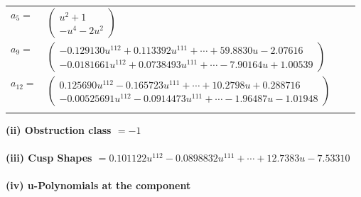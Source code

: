 \documentclass[1p]{elsarticle_modified}
\theoremstyle{definition}
\begin{document}
\begin{tabular}{m{7pt} m{180pt} m{7pt} m{180pt} }
\flushright $a_{5}=$&$\begin{pmatrix}u^2+1\\- u^4-2 u^2\end{pmatrix}$ \\
\flushright $a_{9}=$&$\begin{pmatrix}-0.129130 u^{112}+0.113392 u^{111}+\cdots+59.8830 u-2.07616\\-0.0181661 u^{112}+0.0738493 u^{111}+\cdots-7.90164 u+1.00539\end{pmatrix}$ \\
\flushright $a_{12}=$&$\begin{pmatrix}0.125690 u^{112}-0.165723 u^{111}+\cdots+10.2798 u+0.288716\\-0.00525691 u^{112}-0.0914473 u^{111}+\cdots-1.96487 u-1.01948\end{pmatrix}$\\&\end{tabular}
\flushleft \textbf{(ii) Obstruction class $= -1$}\\~\\
\flushleft \textbf{(iii) Cusp Shapes $= 0.101122 u^{112}-0.0898832 u^{111}+\cdots+12.7383 u-7.53310$}\\~\\
\newpage\renewcommand{\arraystretch}{1}
\flushleft \textbf{(iv) u-Polynomials at the component}\newline \\
\end{document}
